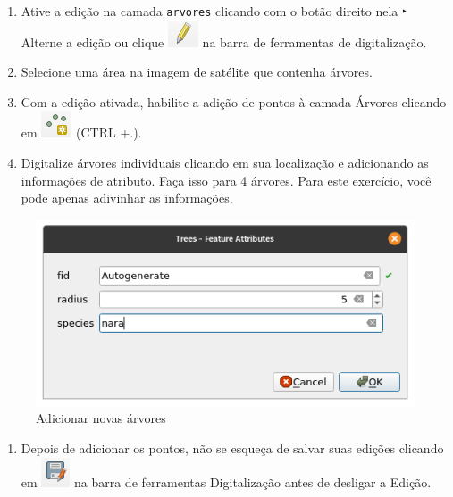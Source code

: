\documentclass[
]{book}
\providecommand{\tightlist}{%
  \setlength{\itemsep}{0pt}\setlength{\parskip}{0pt}}
\begin{document}
\begin{enumerate}
\def\labelenumi{\arabic{enumi}.}
\setcounter{enumi}{3}
\tightlist
\item
  Ative a edição na camada \texttt{arvores} clicando com o botão direito nela ‣ Alterne a edição ou clique \includegraphics{media/modulo2/symbol-edit.png} na barra de ferramentas de digitalização.
\item
  Selecione uma área na imagem de satélite que contenha árvores.
\item
  Com a edição ativada, habilite a adição de pontos à camada Árvores clicando em \includegraphics{media/modulo2/symbol-add-point.png} (CTRL +.).
\item
  Digitalize árvores individuais clicando em sua localização e adicionando as informações de atributo. Faça isso para 4 árvores. Para este exercício, você pode apenas adivinhar as informações.
\end{enumerate}

\begin{figure}
\centering
\includegraphics{media/modulo2/virtual-3.png}
\caption{Adicionar novas árvores}
\end{figure}

\begin{enumerate}
\def\labelenumi{\arabic{enumi}.}
\setcounter{enumi}{7}
\tightlist
\item
  Depois de adicionar os pontos, não se esqueça de salvar suas edições clicando em \includegraphics{media/modulo2/symbol-save-edits.png} na barra de ferramentas Digitalização antes de desligar a Edição.
\end{enumerate}
\end{document}
